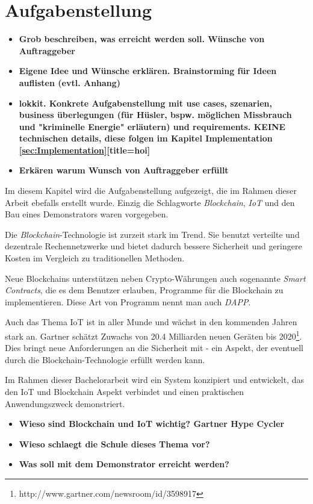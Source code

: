 \chapter{Aufgabenstellung}
\label{cha:Aufgabenstellung}
\begin{itemize}
    \item \textbf{Grob beschreiben, was erreicht werden soll. Wünsche von Auftraggeber}
    \item \textbf{Eigene Idee und Wünsche erklären. Brainstorming für Ideen auflisten (evtl. Anhang)}
    \item \textbf{lokkit. Konkrete Aufgabenstellung mit use cases, szenarien, business überlegungen (für Hüsler, bspw. möglichen Missbrauch und "kriminelle Energie" erläutern) und requirements. KEINE technischen details, diese folgen im Kapitel Implementation \ref{sec:Implementation}[title=hoi]}
    \item \textbf{Erkären warum Wunsch von Auftraggeber erfüllt}
\end{itemize}

Im diesem Kapitel wird die Aufgabenstellung aufgezeigt, die im Rahmen dieser Arbeit ebefalls erstellt wurde. Einzig die Schlagworte \emph{Blockchain}, \emph{\acrfull{IoT}} und den Bau eines Demonstrators waren vorgegeben.

Die \emph{Blockchain}-Technologie ist zurzeit stark im Trend. Sie benutzt verteilte und dezentrale Rechennetzwerke und bietet dadurch bessere Sicherheit und geringere  Kosten im Vergleich zu traditionellen Methoden.

Neue Blockchains unterstützen neben Crypto-Währungen auch sogenannte \emph{Smart Contracts}, die es dem Benutzer erlauben, Programme für die Blockchain zu implementieren. Diese Art von Programm nennt man auch \emph{\acrfull{DAPP}}.

Auch das Thema \acrshort{IoT} ist in aller Munde und wächst in den kommenden Jahren stark an. Gartner schätzt Zuwachs von 20.4 Milliarden neuen Geräten bis 2020\footnote{http://www.gartner.com/newsroom/id/3598917}. Dies bringt neue Anforderungen an die Sicherheit mit - ein Aspekt, der eventuell durch die Blockchain-Technologie erfüllt werden kann.

Im Rahmen dieser Bachelorarbeit wird ein System konzipiert und entwickelt, das den IoT und Blockchain Aspekt verbindet und einen praktischen Anwendungszweck demonstriert.

\begin{itemize}
    \item \textbf{ Wieso sind Blockchain und IoT wichtig? Gartner Hype Cycler}
    \item \textbf{ Wieso schlaegt die Schule dieses Thema vor? }
    \item \textbf{ Was soll mit dem Demonstrator erreicht werden? }
\end{itemize}

